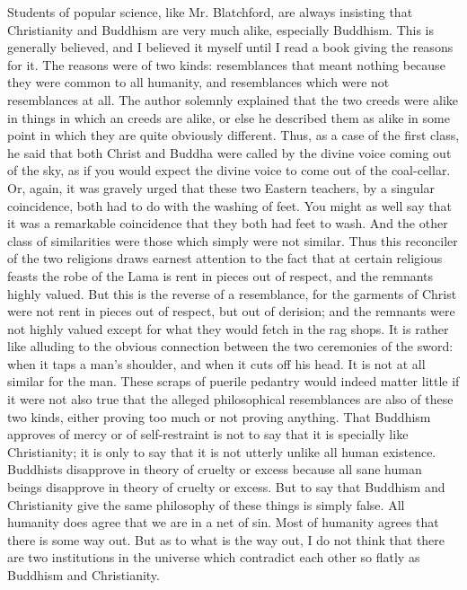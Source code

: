 \documentclass{book}
\begin{document}
Students of popular science, like Mr. Blatchford, are always insisting that Christianity and Buddhism are very much alike, especially Buddhism. This is generally believed, and I believed it myself until I read a book giving the reasons for it. The reasons were of two kinds: resemblances that meant nothing because they were common to all humanity, and resemblances which were not resemblances at all. The author solemnly explained that the two creeds were alike in things in which an creeds are alike, or else he described them as alike in some point in which they are quite obviously different. Thus, as a case of the first class, he said that both Christ and Buddha were called by the divine voice coming out of the sky, as if you would expect the divine voice to come out of the coal-cellar. Or, again, it was gravely urged that these two Eastern teachers, by a singular coincidence, both had to do with the washing of feet. You might as well say that it was a remarkable coincidence that they both had feet to wash. And the other class of similarities were those which simply were not similar. Thus this reconciler of the two religions draws earnest attention to the fact that at certain religious feasts the robe of the Lama is rent in pieces out of respect, and the remnants highly valued. But this is the reverse of a resemblance, for the garments of Christ were not rent in pieces out of respect, but out of derision; and the remnants were not highly valued except for what they would fetch in the rag shops. It is rather like alluding to the obvious connection between the two ceremonies of the sword: when it taps a man’s shoulder, and when it cuts off his head. It is not at all similar for the man. These scraps of puerile pedantry would indeed matter little if it were not also true that the alleged philosophical resemblances are also of these two kinds, either proving too much or not proving anything. That Buddhism approves of mercy or of self-restraint is not to say that it is specially like Christianity; it is only to say that it is not utterly unlike all human existence. Buddhists disapprove in theory of cruelty or excess because all sane human beings disapprove in theory of cruelty or excess. But to say that Buddhism and Christianity give the same philosophy of these things is simply false. All humanity does agree that we are in a net of sin. Most of humanity agrees that there is some way out. But as to what is the way out, I do not think that there are two institutions in the universe which contradict each other so flatly as Buddhism and Christianity.
\end{document}

